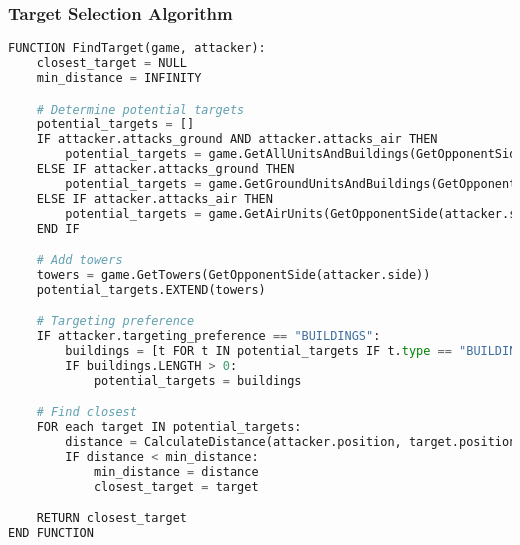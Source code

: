 \documentclass{article}
\begin{document}
\FloatBarrier

\subsubsection{Target Selection Algorithm}
\begin{lstlisting}[language=Python, caption=Target Finding]
FUNCTION FindTarget(game, attacker):
    closest_target = NULL
    min_distance = INFINITY

    # Determine potential targets
    potential_targets = []
    IF attacker.attacks_ground AND attacker.attacks_air THEN
        potential_targets = game.GetAllUnitsAndBuildings(GetOpponentSide(attacker.side))
    ELSE IF attacker.attacks_ground THEN
        potential_targets = game.GetGroundUnitsAndBuildings(GetOpponentSide(attacker.side))
    ELSE IF attacker.attacks_air THEN
        potential_targets = game.GetAirUnits(GetOpponentSide(attacker.side))
    END IF

    # Add towers
    towers = game.GetTowers(GetOpponentSide(attacker.side))
    potential_targets.EXTEND(towers)

    # Targeting preference
    IF attacker.targeting_preference == "BUILDINGS":
        buildings = [t FOR t IN potential_targets IF t.type == "BUILDING" OR t.type == "TOWER"]
        IF buildings.LENGTH > 0:
            potential_targets = buildings

    # Find closest
    FOR each target IN potential_targets:
        distance = CalculateDistance(attacker.position, target.position)
        IF distance < min_distance:
            min_distance = distance
            closest_target = target

    RETURN closest_target
END FUNCTION
\end{lstlisting}

\FloatBarrier

\end{document}
